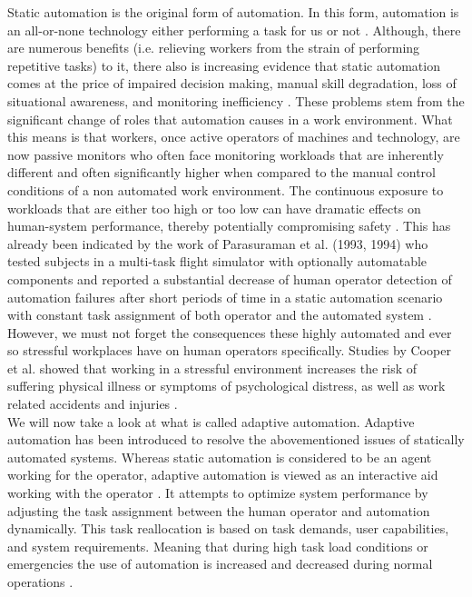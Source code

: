 Static automation is the original form of automation. In this form, automation is an all-or-none technology either performing a task for us or not \cite{Byrne1996}.
Although, there are numerous benefits (i.e. relieving workers from the strain of performing repetitive tasks) to it, there also is increasing evidence that static automation comes at the price of impaired decision making, manual skill degradation, loss of situational awareness, and monitoring inefficiency \cite{Byrne1996}.
These problems stem from the significant change of roles that automation causes in a work environment. What this means is that workers, once active operators of machines and technology, are now passive monitors who often face monitoring workloads that are inherently different and often significantly higher when compared to the manual control conditions of a non automated work environment. The continuous exposure to workloads that are either too high or too low can have dramatic effects on human-system performance, thereby potentially compromising safety \cite{Mehta2013}. This has already been indicated by the work of Parasuraman et al. (1993, 1994) who tested subjects in a multi-task flight simulator with optionally automatable components and reported a substantial decrease of human operator detection of automation failures after short periods of time in a static automation scenario with constant task assignment of both operator and the automated system \cite{Byrne1996}.
However, we must not forget the consequences these highly automated and ever so stressful workplaces have on human operators specifically. Studies by Cooper et al. showed that working in a stressful environment increases the risk of suffering physical illness or symptoms of psychological distress, as well as work related accidents and injuries \cite{Clarke2004}.\\
We will now take a look at what is called adaptive automation. Adaptive automation has been introduced to resolve the abovementioned issues of statically automated systems.
Whereas static automation is considered to be an agent working for the operator, adaptive automation is viewed as an interactive aid working with the operator \cite{Byrne1996}. It attempts to optimize system performance by adjusting the task assignment between the human operator and automation dynamically. This task reallocation is based on task demands, user capabilities, and system requirements. Meaning that during high task load conditions or emergencies the use of automation is increased and decreased during normal operations \cite{Mehta2013}.
